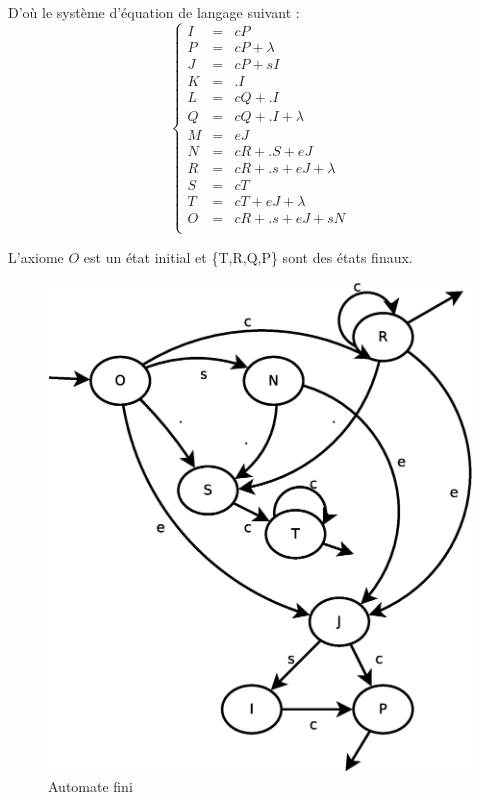 \documentclass[12pt,a4paper,openany]{book}
\begin{document}
D'où le système d'équation de langage suivant : 
\begin{displaymath}
	\left\{ \begin{array}{ccc}
		I &=& cP\\
		P &=&cP+\lambda\\
		J &=& cP+sI\\
		K &=&  .I\\
		L &=& cQ+.I\\
		Q &=&  cQ+.I+\lambda\\
		M &=& eJ\\
		N &=&  cR+.S+eJ\\
		R &=& cR + .s+eJ+\lambda\\
		S &=& cT\\
		T &=& cT+eJ+\lambda\\
		O &=&  cR+.s+eJ+sN\\
	\end{array}
	\right.
\end{displaymath}

L'axiome $O$ est un état initial et \{T,R,Q,P\} sont des états finaux.

\begin{figure}[H]
	\centering
	\includegraphics[width=12cm]{Diagramme2.eps}
	\caption{Automate fini}
\end{figure}
\end{document}
